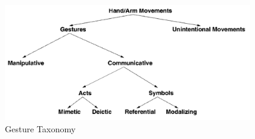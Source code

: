 \begin{figure}
	[h] \centering 
	\includegraphics[height=5cm]{figures/content/ges-tax.png} \caption{Gesture Taxonomy} \label{fg:ges:tax} 
\end{figure}
